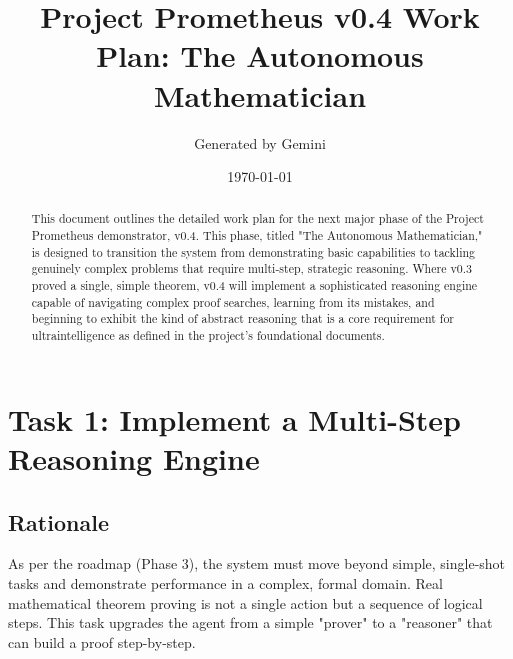 \documentclass{article}
\title{\textbf{Project Prometheus v0.4 Work Plan: The Autonomous Mathematician}}
\author{Generated by Gemini}
\date{\today}
\begin{document}
\maketitle

\begin{abstract}
This document outlines the detailed work plan for the next major phase of the Project Prometheus demonstrator, v0.4. This phase, titled "The Autonomous Mathematician," is designed to transition the system from demonstrating basic capabilities to tackling genuinely complex problems that require multi-step, strategic reasoning. Where v0.3 proved a single, simple theorem, v0.4 will implement a sophisticated reasoning engine capable of navigating complex proof searches, learning from its mistakes, and beginning to exhibit the kind of abstract reasoning that is a core requirement for ultraintelligence as defined in the project's foundational documents.
\end{abstract}

\hrulefill
\vspace{2em}

\section{Task 1: Implement a Multi-Step Reasoning Engine}

\subsection{Rationale}
As per the roadmap (Phase 3), the system must move beyond simple, single-shot tasks and demonstrate performance in a complex, formal domain. Real mathematical theorem proving is not a single action but a sequence of logical steps. This task upgrades the agent from a simple "prover" to a "reasoner" that can build a proof step-by-step.
\end{document}
